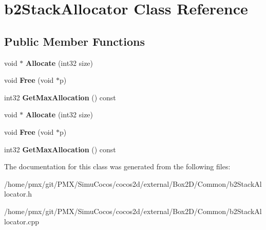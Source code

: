 \hypertarget{classb2StackAllocator}{}\section{b2\+Stack\+Allocator Class Reference}
\label{classb2StackAllocator}
\subsection*{Public Member Functions}
\begin{DoxyCompactItemize}
\item 
\mbox{\label{classb2StackAllocator_a4b8c515d8e1a1c2d5b151c3a2f96fa19}} 
void $\ast$ {\bfseries Allocate} (int32 size)
\item 
\mbox{\label{classb2StackAllocator_a3a4384cf5f467828db3022985673db66}} 
void {\bfseries Free} (void $\ast$p)
\item 
\mbox{\label{classb2StackAllocator_a9670b9ce67f939004f227d1be883404f}} 
int32 {\bfseries Get\+Max\+Allocation} () const
\item 
\mbox{\label{classb2StackAllocator_a3319923944404ab8bad447db0e00d391}} 
void $\ast$ {\bfseries Allocate} (int32 size)
\item 
\mbox{\label{classb2StackAllocator_a3a4384cf5f467828db3022985673db66}} 
void {\bfseries Free} (void $\ast$p)
\item 
\mbox{\label{classb2StackAllocator_a9670b9ce67f939004f227d1be883404f}} 
int32 {\bfseries Get\+Max\+Allocation} () const
\end{DoxyCompactItemize}


The documentation for this class was generated from the following files\+:\begin{DoxyCompactItemize}
\item 
/home/pmx/git/\+P\+M\+X/\+Simu\+Cocos/cocos2d/external/\+Box2\+D/\+Common/b2\+Stack\+Allocator.\+h\item 
/home/pmx/git/\+P\+M\+X/\+Simu\+Cocos/cocos2d/external/\+Box2\+D/\+Common/b2\+Stack\+Allocator.\+cpp\end{DoxyCompactItemize}
